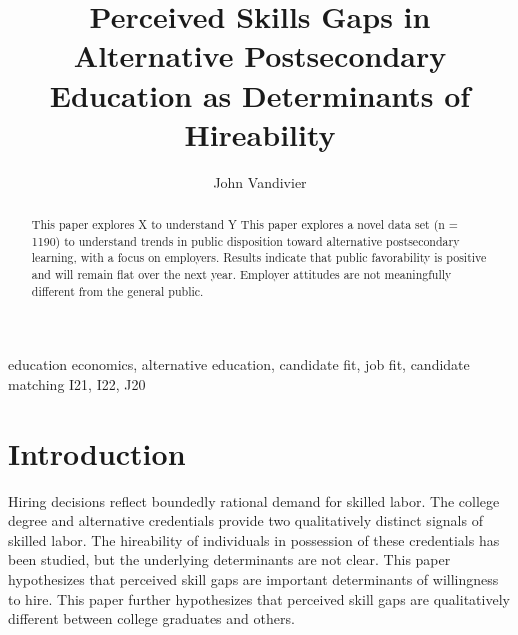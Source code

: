 \documentclass[review]{elsarticle}
\begin{document}
\begin{frontmatter}

    \title{
        Perceived Skills Gaps in Alternative Postsecondary Education as Determinants of Hireability
    }

    \author[mymainaddress]{John Vandivier}
    \address[mymainaddress]{4400 University Dr, Fairfax, VA 22030}

    \begin{abstract}
        This paper explores X to understand Y
        This paper explores a novel data set (n = 1190) to understand trends in public
        disposition toward alternative postsecondary learning, with a focus on employers.
        Results indicate that public favorability is positive and will remain flat over the next year.
        Employer attitudes are not meaningfully different from the general public.
    \end{abstract}

    \begin{keyword}
        education economics, alternative education, candidate fit, job fit, candidate matching     %
        \MSC[2010] I21, I22, J20                                                                   %
    \end{keyword}

\end{frontmatter}

\pagebreak
\linenumbers

\section{Introduction}

Hiring decisions reflect boundedly rational demand for skilled labor.
The college degree and alternative credentials provide two qualitatively distinct signals of skilled labor.
The hireability of individuals in possession of these credentials has been studied,
but the underlying determinants are not clear.
This paper hypothesizes that perceived skill gaps are important determinants of willingness to hire.
This paper further hypothesizes that perceived skill gaps are qualitatively different between college graduates and others.
\end{document}
